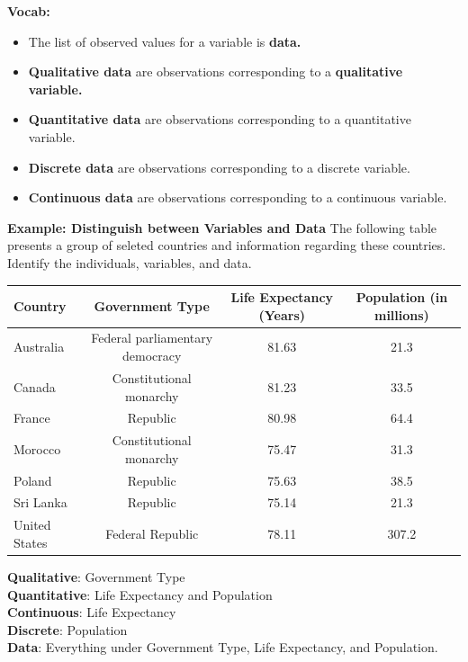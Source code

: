 \documentclass{report}
\begin{document}
        \bigbreak \noindent 
        \textbf{Vocab:}
        \begin{itemize}
            \item The list of observed values for a variable is \textbf{data.}
            \item \textbf{Qualitative data} are observations corresponding to a \textbf{qualitative variable.}
            \item \textbf{Quantitative data} are observations corresponding to a quantitative variable.
            \item \textbf{Discrete data} are observations corresponding to a discrete variable.
            \item \textbf{Continuous data} are observations corresponding to a continuous variable.
        \end{itemize}

        \bigbreak \noindent 
        \begin{mdframed}
          \textbf{Example: Distinguish between Variables and Data}
          \bigbreak \noindent 
          The following table presents a group of seleted countries and information regarding these countries.
          \bigbreak \noindent 
          Identify the individuals, variables, and data.
          \begin{center}
              \begin{tabular}{|l|c|c|c|}
              \hline
              Country & Government Type & Life Expectancy (Years) & Population (in millions) \\
              	\hline
              Australia & Federal parliamentary democracy & 81.63 & 21.3   \\
              	\hline
            Canada & Constitutional monarchy & 81.23 & 33.5 \\
            \hline
            France & Republic & 80.98 & 64.4 \\
            \hline
            Morocco & Constitutional monarchy & 75.47 & 31.3 \\
            \hline
            Poland & Republic & 75.63 & 38.5 \\
            \hline
            Sri Lanka & Republic & 75.14 & 21.3\\
            \hline
            United States & Federal Republic & 78.11 & 307.2 \\
            \hline
              \end{tabular}
          \end{center}
          \bigbreak \noindent 
          \textbf{Qualitative}: Government Type \\
          \textbf{Quantitative}: Life Expectancy and Population \\
          \textbf{Continuous}: Life Expectancy \\
          \textbf{Discrete}: Population \\
          \textbf{Data}: Everything under Government Type, Life Expectancy, and Population.
      \item 
        \end{mdframed}
\end{document}
